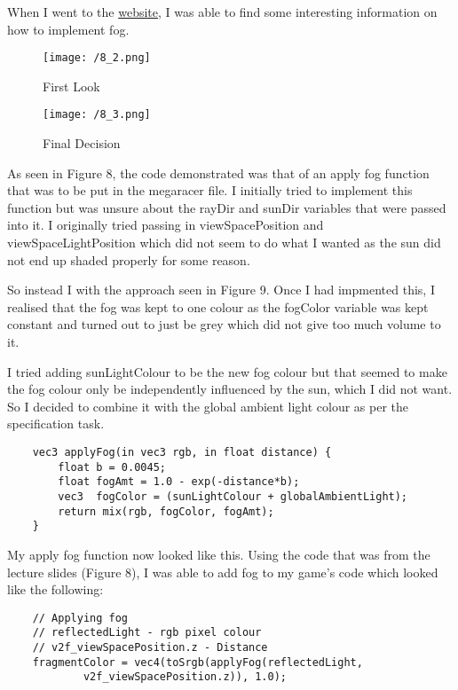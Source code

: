 \documentclass[11pt, oneside, a4paper]{article}
\begin{document}
When I went to the \href{https://iquilezles.org/www/articles/fog/fog.htm}{website}, I was able to find some interesting information on how to implement fog. 

\begin{figure}[H]
    \centering
    \begin{minipage}{1\textwidth}
        \centering
        \texttt{[image: /8\_2.png]}
        \caption{First Look}
    \end{minipage}
    \begin{minipage}{1\textwidth}
        \centering
        \texttt{[image: /8\_3.png]}
        \caption{Final Decision}
    \end{minipage}
\end{figure} 

As seen in Figure 8, the code demonstrated was that of an apply fog function that was to be put in the megaracer file. I initially tried to implement this function but was unsure about the rayDir and sunDir variables that were passed into it. I originally tried passing in viewSpacePosition and viewSpaceLightPosition which did not seem to do what I wanted as the sun did not end up shaded properly for some reason.

So instead I with the approach seen in Figure 9. Once I had impmented this, I realised that the fog was kept to one colour as the fogColor variable was kept constant and turned out to just be grey which did not give too much volume to it. 

I tried adding sunLightColour to be the new fog colour but that seemed to make the fog colour only be independently influenced by the sun, which I did not want. So I decided to combine it with the global ambient light colour as per the specification task.

\begin{lstlisting}
    vec3 applyFog(in vec3 rgb, in float distance) {
        float b = 0.0045; 
        float fogAmt = 1.0 - exp(-distance*b);
        vec3  fogColor = (sunLightColour + globalAmbientLight);
        return mix(rgb, fogColor, fogAmt);
    }
\end{lstlisting}

My apply fog function now looked like this. Using the code that was from the lecture slides (Figure 8), I was able to add fog to my game's code which looked like the following:

\begin{lstlisting}
    // Applying fog
    // reflectedLight - rgb pixel colour
    // v2f_viewSpacePosition.z - Distance
    fragmentColor = vec4(toSrgb(applyFog(reflectedLight,
            v2f_viewSpacePosition.z)), 1.0);
\end{lstlisting}
\end{document}
